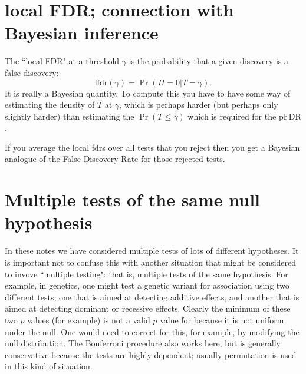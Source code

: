 \documentclass[times,11pt]{article}
\def\pFDR{\text{pFDR}}
\begin{document}
\section{local FDR; connection with Bayesian inference}

The ``local FDR" at a threshold $\gamma$ is the probability that a given discovery is a false discovery: 
\begin{equation}
\text{lfdr}(\gamma) = \Pr(H = 0 | T=\gamma).
\end{equation}
It is really a Bayesian quantity. 
To compute this you have to have some way of estimating the density of $T$ at $\gamma$, which is perhaps harder (but perhaps only slightly harder) than estimating the $\Pr(T \leq \gamma)$ which is
required for the $\pFDR$.

If you average the local fdrs over all tests that you reject then you get a Bayesian analogue of the False Discovery Rate for those rejected tests.

\section{Multiple tests of the same null hypothesis}

In these notes we have considered multiple tests of lots of different hypotheses. It is important not to confuse this with another situation that might be considered to invove ``multiple testing": that is,
multiple tests of the same hypothesis. For example, 
in genetics, one might test a genetic variant for association using two different tests, one that is
aimed at detecting additive effects, and another that is aimed at detecting dominant or recessive effects.
Clearly the minimum of these two $p$ values (for example) is not a valid $p$ value for because it is not uniform under the null. One would need to correct for this, for example, by modifying the null distribution. The Bonferroni procedure also works here, but is generally conservative because the tests are highly dependent; usually permutation is used in this kind of situation.



\end{document}
